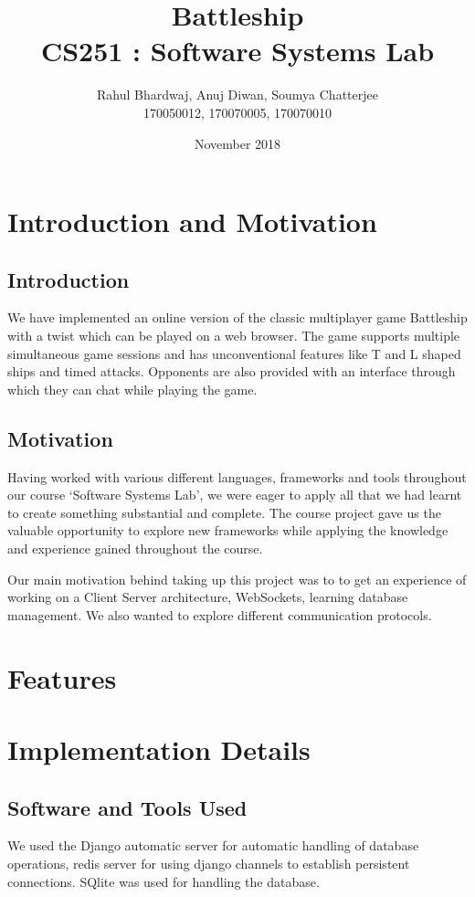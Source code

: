 \documentclass[titlepage]{article}
\title{\textbf{Battleship} \\ CS251 : Software Systems Lab}
\author{Rahul Bhardwaj, Anuj Diwan, Soumya Chatterjee \\ 170050012, 170070005, 170070010}
\date{November 2018}
\begin{document}
\maketitle

\tableofcontents

\break

\section{Introduction and Motivation}
\subsection{Introduction}
We have implemented an online version of the classic multiplayer game Battleship with a twist which can be played on a web browser. The game supports multiple simultaneous game sessions and has unconventional features like T and L shaped ships and timed attacks. Opponents are also provided with an interface through which they can chat while playing the game.

\subsection{Motivation}
Having worked with various different languages, frameworks and tools throughout our course `Software Systems Lab', we were eager to apply all that we had learnt to create something substantial and complete. The course project gave us the valuable opportunity to explore new frameworks while applying the knowledge and experience gained throughout the course.

Our main motivation behind taking up this project was to to get an experience of working on a Client Server architecture, WebSockets, learning database management. We also wanted to explore different communication protocols.
\section{Features}

\section{Implementation Details}
\subsection{Software and Tools Used}
We used the Django automatic server for automatic handling of database operations, redis server for using django channels to establish persistent connections. SQlite was used for handling the database. 
\end{document}
